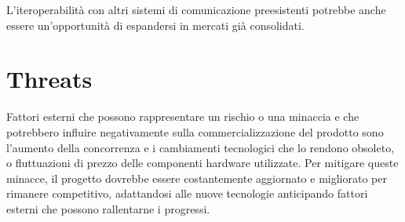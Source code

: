 L'iteroperabilità con altri sistemi di comunicazione preesistenti potrebbe anche essere un'opportunità 
di espandersi in mercati già consolidati.

\section{Threats}

Fattori esterni che possono rappresentare un rischio o una minaccia e che potrebbero influire negativamente sulla 
commercializzazione del prodotto sono l'aumento della concorrenza e i cambiamenti tecnologici che lo rendono obsoleto, o 
fluttuazioni di prezzo delle componenti hardware utilizzate.
Per mitigare queste minacce, il progetto dovrebbe essere costantemente
aggiornato e migliorato per rimanere competitivo, adattandosi alle nuove tecnologie anticipando fattori esterni
che possono rallentarne i progressi.